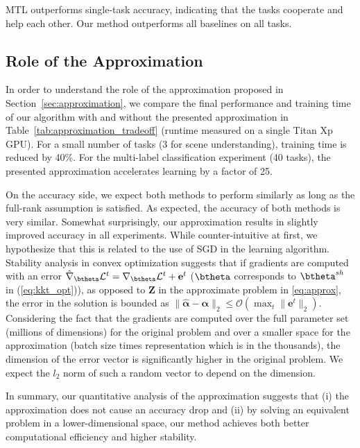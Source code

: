 MTL outperforms single-task accuracy, indicating that the tasks cooperate and help each other. Our method outperforms all baselines on all tasks.


\subsection{Role of the Approximation}

In order to understand the role of the approximation proposed in Section~\ref{sec:approximation}, we compare the final performance and training time of our algorithm with and without the presented approximation in Table~\ref{tab:approximation_tradeoff} (runtime measured on a single Titan Xp GPU). For a small number of tasks (3 for scene understanding), training time is reduced by 40\%. For the multi-label classification experiment (40 tasks), the presented approximation accelerates learning by a factor of 25.

On the accuracy side, we expect both methods to perform similarly as long as the full-rank assumption is satisfied. As expected, the accuracy of both methods is very similar. Somewhat surprisingly, our approximation results in slightly improved accuracy in all experiments. While counter-intuitive at first, we hypothesize that this is related to the use of SGD in the learning algorithm. Stability analysis in convex optimization suggests that if gradients are computed with an error $\hat{\nabla}_\btheta \mathcal{L}^t = \nabla_\btheta \mathcal{L}^t + \mathbf{e}^t$ ($\btheta$ corresponds to $\btheta^{sh}$ in (\ref{eq:kkt_opt})), as opposed to $\mathbf{Z}$ in the approximate problem in \ref{eq:approx}, the error in the solution is bounded as $\|\hat{\mathbf{\alpha}} - \mathbf{\alpha} \|_2 \leq \mathcal{O}(\max_t \|\mathbf{e}^t\|_2)$. Considering the fact that the gradients are computed over the full parameter set (millions of dimensions) for the original problem and over a smaller space for the approximation (batch size times representation which is in the thousands), the dimension of the error vector is significantly higher in the original problem. We expect the $l_2$ norm of such a random vector to depend on the dimension.

In summary, our quantitative analysis of the approximation suggests that (i) the approximation does not cause an accuracy drop and (ii) by solving an equivalent problem in a lower-dimensional space, our method achieves both better computational efficiency and higher stability.


